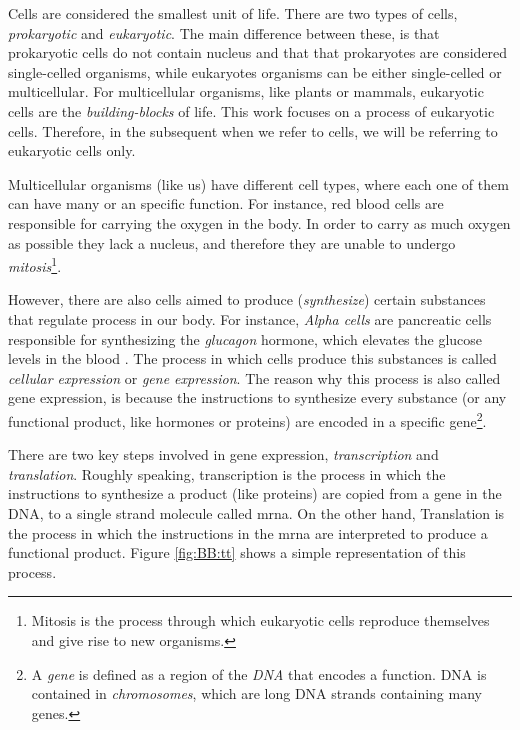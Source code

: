 \glsresetall
\graphicspath{{./Sections/Basics/Resources/}}

Cells are considered the smallest unit of life. There are two types of cells, \textit{prokaryotic} and \textit{eukaryotic}. The main difference between these, is that prokaryotic cells do not contain nucleus and that that prokaryotes are considered single-celled organisms, while eukaryotes organisms can be either single-celled or multicellular. For multicellular organisms, like plants or mammals, eukaryotic cells are the \textit{building-blocks} of life. This work focuses on a process of eukaryotic cells. Therefore, in the subsequent when we refer to cells, we will be referring to eukaryotic cells only.

Multicellular organisms (like us) have different cell types, where each one of them can have many or an specific function. For instance, red blood cells are responsible for carrying the oxygen in the body. In order to carry as much oxygen as possible they lack a nucleus, and therefore they are unable to undergo \textit{mitosis}\footnote{Mitosis is the process through which eukaryotic cells reproduce themselves and give rise to new organisms.}.

However, there are also cells aimed to produce (\textit{synthesize}) certain substances that regulate process in our body. For instance, \textit{Alpha cells} are pancreatic cells responsible for synthesizing the \textit{glucagon} hormone, which elevates the glucose levels in the blood \cite{1e48f81ce88f4602a25a4ebbcea3a6e7}. The process in which cells produce this substances is called \textit{cellular expression} or \textit{gene expression}. The reason why this process is also called gene expression, is because the instructions to synthesize every substance (or any functional product, like hormones or proteins) are encoded in a specific gene\footnote{A \textit{gene} is defined as a region of the \textit{DNA} that encodes a function. DNA is contained in \textit{chromosomes}, which are long DNA strands containing many genes.}.

There are two key steps involved in gene expression, \textit{transcription} and \textit{translation}. Roughly speaking, transcription is the process in which the instructions to synthesize a product (like proteins) are copied from a gene in the DNA, to a single strand molecule called \gls{mrna}. On the other hand, Translation is the process in which the instructions in the \gls{mrna} are interpreted to produce a functional product. Figure \ref{fig:BB:tt} shows a simple representation of this process.

